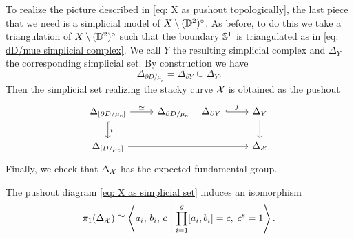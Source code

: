 To realize the picture described in \eqref{eq: X as pushout topologically}, the last piece that we need is a simplicial model of $X \setminus (\mathbb{D}^2)^{\circ}$. As before, to do this we take a triangulation of $X \setminus (\mathbb{D}^2)^{\circ}$ such that the boundary $\mathbb{S}^1$ is triangulated as in \eqref{eq: dD/mue simplicial complex}. We call $Y$ the resulting simplicial complex and $\Delta_Y$ the corresponding simplicial set. By construction we have
\begin{equation}
\Delta_{\partial D/ \mu_e} = \Delta_{\partial Y} \subseteq \Delta_Y.
\end{equation}
Then the simplicial set realizing the stacky curve $\mathcal{X}$ is obtained as the pushout
\begin{equation} \label{eq: X as simplicial set}
\begin{tikzcd}
	{\Delta_{[\partial D / \mu_e]}} & {\Delta_{\partial D / \mu_e} = \Delta_{\partial Y}} & {\Delta_Y} \\
	{\Delta_{[D / \mu_e]}} && {\Delta_{\mc{X}}}
	\arrow["\simeq", from=1-1, to=1-2]
	\arrow["i", hook, from=1-1, to=2-1]
	\arrow["j", hook, from=1-2, to=1-3]
	\arrow[from=1-3, to=2-3]
	\arrow[from=2-1, to=2-3]
	\arrow["\lrcorner"{anchor=center, pos=0.125, rotate=180}, draw=none, from=2-3, to=1-2]
\end{tikzcd}
\end{equation}
Finally, we check that $\Delta_{\mathcal{X}}$ has the expected fundamental group.
\begin{lemma}
The pushout diagram \eqref{eq: X as simplicial set} induces an isomorphism
\begin{equation}
\pi_1(\Delta_{\mathcal{X}}) \cong \left\langle a_i, \, b_i, \, c \;\middle|\; \prod_{i = 1}^g [a_i, b_i] = c, \; c^e = 1 \right\rangle .
\end{equation}
\end{lemma}
